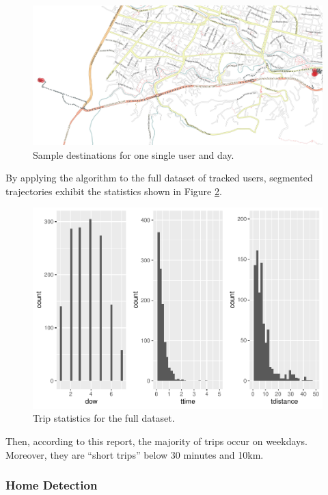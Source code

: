 \documentclass[]{elsarticle} %
\begin{document}
\begin{figure}
\includegraphics[width=0.9\linewidth]{../paper/images/destinos} \caption{\label{fig6}Sample destinations for one single user and day.}\label{fig:unnamed-chunk-7}
\end{figure}

By applying the algorithm to the full dataset of tracked users,
segmented trajectories exhibit the statistics shown in Figure
\ref{fig7}.

\begin{figure}
\centering
\includegraphics{Elsevier_files/figure-latex/trips-plot-1.pdf}
\caption{\label{fig7}Trip statistics for the full dataset.}
\end{figure}

Then, according to this report, the majority of trips occur on weekdays.
Moreover, they are ``short trips'' below 30 minutes and 10km.

\hypertarget{home-detection}{%
\subsubsection{Home Detection}\label{home-detection}}
\end{document}
